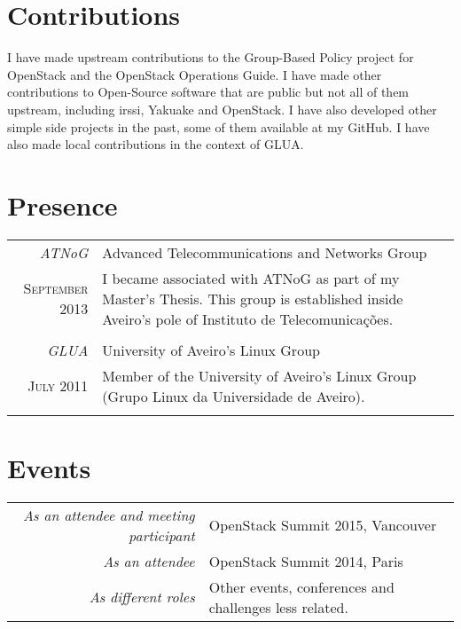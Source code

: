 \documentclass[letter,10pt]{article} %
\begin{document}

\section{Contributions}
I have made upstream contributions to the Group-Based Policy project for OpenStack and the OpenStack Operations Guide. I have made other contributions to Open-Source software that are public but not all of them upstream, including irssi, Yakuake and OpenStack. I have also developed other simple side projects in the past, some of them available at my GitHub. I have also made local contributions in the context of GLUA.

%

\section{Presence}
\begin{tabular}{r|p{11cm}}
    \emph{ATNoG} & Advanced Telecommunications and Networks Group \\
    \textsc{September 2013} & \footnotesize{I became associated with ATNoG as part of my Master's Thesis. This group is established inside Aveiro's pole of Instituto de Telecomunicações.}\\
    \multicolumn{2}{c}{} \\
    \emph{GLUA} & University of Aveiro's Linux Group \\
    \textsc{July 2011} & \footnotesize{Member of the University of Aveiro's Linux Group (Grupo Linux da Universidade de Aveiro).}\\
    \multicolumn{2}{c}{}\\
\end{tabular}


\section{Events}
\begin{tabular}{r|p{11cm}}
    \emph{As an attendee and meeting participant} & OpenStack Summit 2015, Vancouver \\
    \emph{As an attendee} & OpenStack Summit 2014, Paris \\
    \emph{As different roles} & Other events, conferences and challenges less related. \\
\end{tabular} \\
\end{document}
